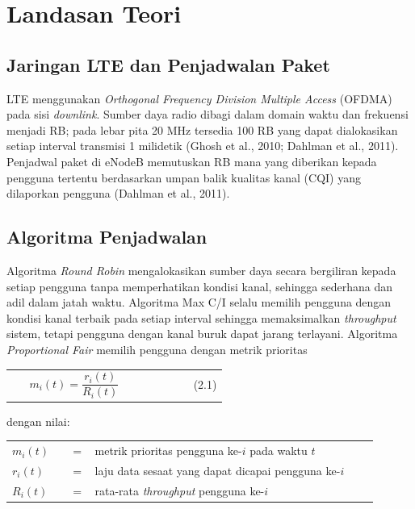 \section{Landasan Teori}

\subsection{Jaringan LTE dan Penjadwalan Paket}
LTE menggunakan \textit{Orthogonal Frequency Division Multiple Access} (OFDMA) pada sisi \textit{downlink}. Sumber daya radio dibagi dalam domain waktu dan frekuensi menjadi RB; pada lebar pita 20 MHz tersedia 100 RB yang dapat dialokasikan setiap interval transmisi 1 milidetik (Ghosh et al., 2010; Dahlman et al., 2011). Penjadwal paket di eNodeB memutuskan RB mana yang diberikan kepada pengguna tertentu berdasarkan umpan balik kualitas kanal (CQI) yang dilaporkan pengguna (Dahlman et al., 2011).

\subsection{Algoritma Penjadwalan}
Algoritma \textit{Round Robin} mengalokasikan sumber daya secara bergiliran kepada setiap pengguna tanpa memperhatikan kondisi kanal, sehingga sederhana dan adil dalam jatah waktu. Algoritma Max C/I selalu memilih pengguna dengan kondisi kanal terbaik pada setiap interval sehingga memaksimalkan \textit{throughput} sistem, tetapi pengguna dengan kanal buruk dapat jarang terlayani. Algoritma \textit{Proportional Fair} memilih pengguna dengan metrik prioritas

\begin{tanpagaris}
\begin{longtable}{@{}p{0.08\linewidth}p{0.76\linewidth}r@{}}
 & $m_{i}(t)=\dfrac{r_{i}(t)}{R_{i}(t)}$ & (2.1) \\
\end{longtable}
\end{tanpagaris}

dengan nilai:

\begin{tanpagaris}
\begin{longtable}{@{}p{0.15\linewidth}p{0.05\linewidth}p{0.7\linewidth}@{}}
$m_{i}(t)$ & = & metrik prioritas pengguna ke-$i$ pada waktu $t$ \\
$r_{i}(t)$ & = & laju data sesaat yang dapat dicapai pengguna ke-$i$ \\
$R_{i}(t)$ & = & rata-rata \textit{throughput} pengguna ke-$i$ \\
\end{longtable}
\end{tanpagaris}

